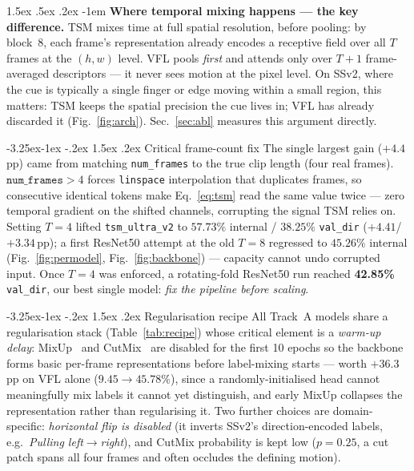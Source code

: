 \documentclass[10pt,twocolumn,letterpaper]{article}
\makeatletter
\renewcommand\subsubsection{\@startsection{subsubsection}{3}{\z@}%
  {-3.25ex\@plus -1ex \@minus -.2ex}%
  {1.5ex \@plus .2ex}%
  {\normalfont\normalsize\bfseries}}
\renewcommand\paragraph{\@startsection{paragraph}{4}{\z@}%
  {1.5ex \@plus .5ex \@minus .2ex}%
  {-1em}%
  {\normalfont\normalsize\bfseries}}
\makeatother
\begin{document}
\paragraph{\textbf{Where temporal mixing happens --- the key difference.}}
TSM mixes time at full spatial resolution, before pooling: by block~8, each
frame's representation already encodes a receptive field over all $T$ frames
at the $(h,w)$ level. VFL pools \emph{first} and attends only over $T{+}1$
frame-averaged descriptors --- it never sees motion at the pixel level. On
SSv2, where the cue is typically a single finger or edge moving within a
small region, this matters: TSM keeps the spatial precision the cue lives in;
VFL has already discarded it (Fig.~\ref{fig:arch}). Sec.~\ref{sec:abl}
measures this argument directly.

\subsubsection{Critical frame-count fix}
The single largest gain ($+4.4$\,pp) came from matching \texttt{num\_frames}
to the true clip length (four real frames). $\texttt{num\_frames}{>}4$ forces
\texttt{linspace} interpolation that duplicates frames, so consecutive
identical tokens make Eq.~\eqref{eq:tsm} read the same value twice --- zero
temporal gradient on the shifted channels, corrupting the signal TSM relies
on. Setting $T{=}4$ lifted \texttt{tsm\_ultra\_v2} to $57.73\%$ internal /
$38.25\%$ \texttt{val\_dir} ($+4.41$/$+3.34$\,pp); a first ResNet50 attempt at
the old $T{=}8$ regressed to $45.26\%$ internal (Fig.~\ref{fig:permodel},
Fig.~\ref{fig:backbone}) --- capacity cannot undo corrupted input. Once
$T{=}4$ was enforced, a rotating-fold ResNet50 run reached
\textbf{42.85\%} \texttt{val\_dir}, our best single model: \emph{fix the
pipeline before scaling}.

\subsubsection{Regularisation recipe}
All Track~A models share a regularisation stack (Table~\ref{tab:recipe})
whose critical element is a \emph{warm-up delay}: MixUp~\cite{zhang2018mixup}
and CutMix~\cite{yun2019cutmix} are disabled for the first 10 epochs so the
backbone forms basic per-frame representations before label-mixing starts
--- worth $+36.3$\,pp on VFL alone ($9.45\!\rightarrow\!45.78\%$), since a
randomly-initialised head cannot meaningfully mix labels it cannot yet
distinguish, and early MixUp collapses the representation rather than
regularising it. Two further choices are domain-specific:
\emph{horizontal flip is disabled} (it inverts SSv2's direction-encoded
labels, e.g.\ \emph{Pulling left$\rightarrow$right}), and CutMix probability
is kept low ($p{=}0.25$, a cut patch spans all four frames and often occludes
the defining motion).
\end{document}
